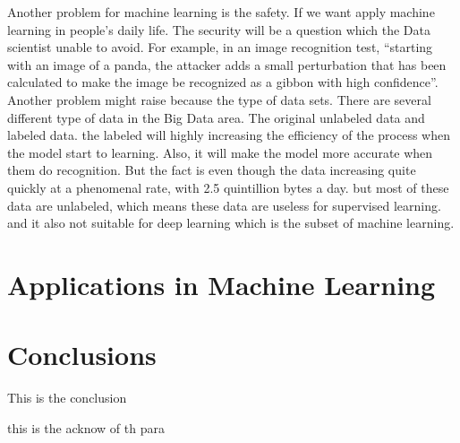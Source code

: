 \documentclass[sigconf]{acmart}
\begin{document}
Another problem for machine learning is the safety. If we want apply machine learning in people’s daily life. The security will be a question which the Data scientist unable to avoid. For example, in an image recognition test, ``starting with an image of a panda, the attacker adds a small perturbation that has been calculated to make the image be recognized as a gibbon with high confidence''\cite{Ophir}.
Another problem might raise because the type of data sets. There are several different type of data in the Big Data area. The original unlabeled data and labeled data. the labeled will highly increasing the efficiency of the process when the model start to learning. Also, it will make the model more accurate when them do recognition. But the fact is even though the data increasing quite quickly at a phenomenal rate, with 2.5 quintillion bytes a day. but most of these data are unlabeled, which means these data are useless for supervised learning. and it also not suitable for deep learning which is the subset of machine learning.
\section{Applications in Machine Learning}

\section{Conclusions}

This is the conclusion



\appendix








\begin{acks}

  this is the acknow of th para

\end{acks}


 
\end{document}
